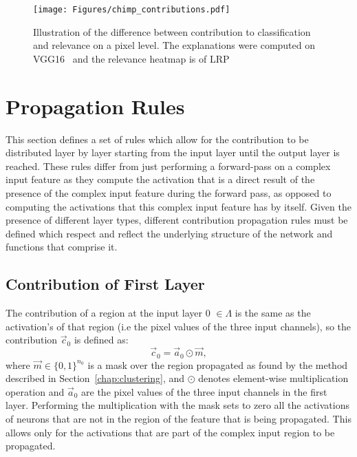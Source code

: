 \begin{figure}[h]
\centering
\texttt{[image: Figures/chimp\_contributions.pdf]}
	\caption{ Illustration of the difference between contribution to classification and relevance on a pixel level. The explanations were computed on VGG16~\cite{szegedy2016rethinking} and the relevance heatmap is of LRP~\cite{bach2015pixel}}
	\label{fig:contribution}
\end{figure}


\section{Propagation Rules}

This section defines a set of rules which allow for the contribution to be distributed layer by layer starting from the input layer until the output layer is reached. These rules differ from just performing a forward-pass on a complex input feature as they compute the activation that is a direct result of the presence of the complex input feature during the forward pass, as opposed to computing the activations that this complex input feature has by itself. Given the presence of different layer types, different contribution propagation rules must be defined which respect and reflect the underlying structure of the network and functions that comprise it.


\subsection{Contribution of First Layer}
The contribution of a region at the input layer 0 $\in \Lambda$ is the same as the activation's of that region (i.e the pixel values of the three input channels), so the contribution $\vec{c}_0$ is defined as:
\begin{equation*}
    \vec{c}_0 = \vec{a}_0 \odot \vec{m},
\end{equation*}
where $\vec{m}\in \{0,1\}^{n_0}$ is a mask over the region propagated as found by the method described in Section~\ref{chap:clustering}, and $\odot$ denotes element-wise multiplication operation and $\vec{a}_0$ are the pixel values of the three input channels in the first layer. Performing the multiplication with the mask sets to zero all the activations of neurons that are not in the region of the feature that is being propagated. This allows only for the activations that are part of the complex input region to be propagated. 

